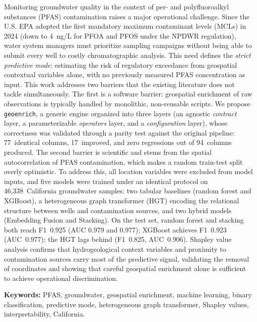 \let\oldprintchaptertitle=\printchaptertitle
\renewcommand{\printchaptertitle}[1]{%
	\vspace*{-75pt}
	\oldprintchaptertitle{#1}
}%
\let\printchaptertitle=\oldprintchaptertitle

Monitoring groundwater quality in the context of per- and polyfluoroalkyl substances (PFAS) contamination raises a major operational challenge. Since the U.S. EPA adopted the first mandatory maximum contaminant levels (MCLs) in 2024 (down to 4~ng/L for PFOA and PFOS under the NPDWR regulation), water system managers must prioritize sampling campaigns without being able to submit every well to costly chromatographic analysis. This need defines the \emph{strict predictive mode}: estimating the risk of regulatory exceedance from geospatial contextual variables alone, with no previously measured PFAS concentration as input. This work addresses two barriers that the existing literature does not tackle simultaneously. The first is a software barrier: geospatial enrichment of raw observations is typically handled by monolithic, non-reusable scripts. We propose \texttt{geoenrich}, a generic engine organized into three layers (an agnostic \emph{contract} layer, a parameterizable \emph{operators} layer, and a \emph{configuration} layer), whose correctness was validated through a parity test against the original pipeline: 77~identical columns, 17~improved, and zero regressions out of 94~columns produced. The second barrier is scientific and stems from the spatial autocorrelation of PFAS contamination, which makes a random train-test split overly optimistic. To address this, all location variables were excluded from model inputs, and five models were trained under an identical protocol on 46,338~California groundwater samples: two tabular baselines (random forest and XGBoost), a heterogeneous graph transformer (HGT) encoding the relational structure between wells and contamination sources, and two hybrid models (Embedding Fusion and Stacking). On the test set, random forest and stacking both reach F1~0.925 (AUC 0.979 and 0.977); XGBoost achieves F1~0.923 (AUC~0.977); the HGT lags behind (F1~0.825, AUC~0.906). Shapley value analysis confirms that hydrogeological context variables and proximity to contamination sources carry most of the predictive signal, validating the removal of coordinates and showing that careful geospatial enrichment alone is sufficient to achieve operational discrimination.

\vspace{1cm}
\noindent\textbf{Keywords:} PFAS, groundwater, geospatial enrichment, machine learning, binary classification, predictive mode, heterogeneous graph transformer, Shapley values, interpretability, California.

\myCleanStarChapterEnd
